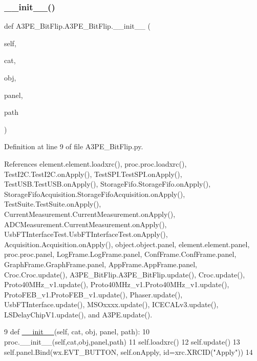 \subsubsection{\texorpdfstring{\+\_\+\+\_\+init\+\_\+\+\_\+()}{\_\_init\_\_()}}
{\footnotesize\ttfamily def A3\+P\+E\+\_\+\+Bit\+Flip.\+A3\+P\+E\+\_\+\+Bit\+Flip.\+\_\+\+\_\+init\+\_\+\+\_\+ (\begin{DoxyParamCaption}\item[{}]{self,  }\item[{}]{cat,  }\item[{}]{obj,  }\item[{}]{panel,  }\item[{}]{path }\end{DoxyParamCaption})}



Definition at line 9 of file A3\+P\+E\+\_\+\+Bit\+Flip.\+py.



References element.\+element.\+loadxrc(), proc.\+proc.\+loadxrc(), Test\+I2\+C.\+Test\+I2\+C.\+on\+Apply(), Test\+S\+P\+I.\+Test\+S\+P\+I.\+on\+Apply(), Test\+U\+S\+B.\+Test\+U\+S\+B.\+on\+Apply(), Storage\+Fifo.\+Storage\+Fifo.\+on\+Apply(), Storage\+Fifo\+Acquisition.\+Storage\+Fifo\+Acquisition.\+on\+Apply(), Test\+Suite.\+Test\+Suite.\+on\+Apply(), Current\+Measurement.\+Current\+Measurement.\+on\+Apply(), A\+D\+C\+Measurement.\+Current\+Measurement.\+on\+Apply(), Usb\+F\+T\+Interface\+Test.\+Usb\+F\+T\+Interface\+Test.\+on\+Apply(), Acquisition.\+Acquisition.\+on\+Apply(), object.\+object.\+panel, element.\+element.\+panel, proc.\+proc.\+panel, Log\+Frame.\+Log\+Frame.\+panel, Conf\+Frame.\+Conf\+Frame.\+panel, Graph\+Frame.\+Graph\+Frame.\+panel, App\+Frame.\+App\+Frame.\+panel, Croc.\+Croc.\+update(), A3\+P\+E\+\_\+\+Bit\+Flip.\+A3\+P\+E\+\_\+\+Bit\+Flip.\+update(), Croc.\+update(), Proto40\+M\+Hz\+\_\+v1.\+update(), Proto40\+M\+Hz\+\_\+v1.\+Proto40\+M\+Hz\+\_\+v1.\+update(), Proto\+F\+E\+B\+\_\+v1.\+Proto\+F\+E\+B\+\_\+v1.\+update(), Phaser.\+update(), Usb\+F\+T\+Interface.\+update(), M\+S\+Oxxxx.\+update(), I\+C\+E\+C\+A\+Lv3.\+update(), L\+S\+Delay\+Chip\+V1.\+update(), and A3\+P\+E.\+update().


\begin{DoxyCode}
9     \textcolor{keyword}{def }\hyperlink{classwrapper_1_1ModuleDictWrapper_a9a7a794150502f51df687831583e13b9}{\_\_init\_\_}(self, cat, obj, panel, path):
10         proc.\_\_init\_\_(self,cat,obj,panel,path)
11         self.loadxrc()
12         self.update()
13         self.panel.Bind(wx.EVT\_BUTTON, self.onApply, id=xrc.XRCID(\textcolor{stringliteral}{"Apply"}))
14 
\end{DoxyCode}


